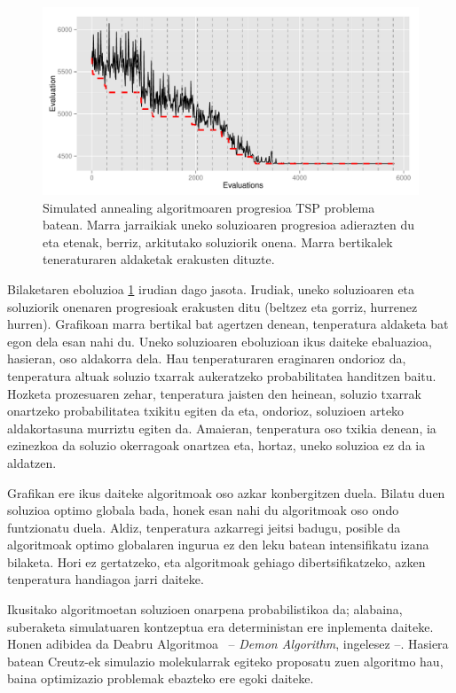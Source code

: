 \documentclass[eu]{ifirak}\usepackage[]{graphicx}\usepackage[]{color}
\begin{document}
\begin{figure}[t]
\centering
\includegraphics[width=0.75\linewidth]{./Irudiak/TSP_SA_7-1}
\caption{Simulated annealing algoritmoaren progresioa TSP problema batean. Marra jarraikiak uneko soluzioaren progresioa adierazten du eta etenak, berriz, arkitutako soluziorik onena. Marra bertikalek teneraturaren aldaketak erakusten dituzte.}
\label{fig:SA}
\end{figure}

Bilaketaren eboluzioa \ref{fig:SA} irudian dago jasota. Irudiak, uneko soluzioaren eta soluziorik onenaren progresioak erakusten ditu (beltzez eta gorriz, hurrenez hurren). Grafikoan marra bertikal bat agertzen denean, tenperatura aldaketa bat egon dela esan nahi du. Uneko soluzioaren eboluzioan ikus daiteke ebaluazioa, hasieran, oso aldakorra dela. Hau tenperaturaren eraginaren ondorioz da, tenperatura altuak soluzio txarrak aukeratzeko probabilitatea handitzen baitu. Hozketa prozesuaren zehar, tenperatura jaisten den heinean, soluzio txarrak onartzeko probabilitatea txikitu egiten da eta, ondorioz, soluzioen arteko aldakortasuna murriztu egiten da. Amaieran, tenperatura oso txikia denean, ia ezinezkoa da soluzio okerragoak onartzea eta, hortaz, uneko soluzioa ez da ia aldatzen.

 Grafikan ere ikus daiteke algoritmoak oso azkar konbergitzen duela. Bilatu duen soluzioa optimo globala bada, honek esan nahi du algoritmoak oso ondo funtzionatu duela. Aldiz, tenperatura azkarregi jeitsi badugu, posible da algoritmoak optimo globalaren ingurua ez den leku batean intensifikatu izana bilaketa. Hori ez gertatzeko, eta algoritmoak gehiago dibertsifikatzeko, azken tenperatura handiagoa jarri daiteke. 

Ikusitako algoritmoetan soluzioen onarpena probabilistikoa da; alabaina, suberaketa simulatuaren kontzeptua era deterministan ere inplementa daiteke. Honen adibidea da Deabru Algoritmoa~\cite{pepper2000} -- \textit{Demon Algorithm}, ingelesez --. Hasiera batean Creutz-ek  simulazio molekularrak egiteko proposatu zuen algoritmo hau, baina optimizazio problemak ebazteko ere egoki daiteke. 
\end{document}
